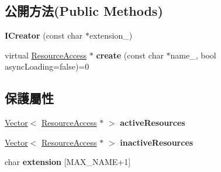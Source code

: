 \subsection*{公開方法(Public Methods)}
\begin{DoxyCompactItemize}
\item 
{\bfseries I\+Creator} (const char $\ast$extension\+\_\+)\hypertarget{class_magnum_1_1_resource_access_1_1_i_creator_a86b8e0149a78a786a3d72f5f0ebf4f81}{}\label{class_magnum_1_1_resource_access_1_1_i_creator_a86b8e0149a78a786a3d72f5f0ebf4f81}

\item 
virtual \hyperlink{class_magnum_1_1_resource_access}{Resource\+Access} $\ast$ {\bfseries create} (const char $\ast$name\+\_\+, bool async\+Loading=false)=0\hypertarget{class_magnum_1_1_resource_access_1_1_i_creator_aa8d4710c6f1c322f9a6bc58c34b0496f}{}\label{class_magnum_1_1_resource_access_1_1_i_creator_aa8d4710c6f1c322f9a6bc58c34b0496f}

\end{DoxyCompactItemize}
\subsection*{保護屬性}
\begin{DoxyCompactItemize}
\item 
\hyperlink{class_magnum_1_1_vector}{Vector}$<$ \hyperlink{class_magnum_1_1_resource_access}{Resource\+Access} $\ast$ $>$ {\bfseries active\+Resources}\hypertarget{class_magnum_1_1_resource_access_1_1_i_creator_a64cf122fb2f630a4e4e6f172a5d204c7}{}\label{class_magnum_1_1_resource_access_1_1_i_creator_a64cf122fb2f630a4e4e6f172a5d204c7}

\item 
\hyperlink{class_magnum_1_1_vector}{Vector}$<$ \hyperlink{class_magnum_1_1_resource_access}{Resource\+Access} $\ast$ $>$ {\bfseries inactive\+Resources}\hypertarget{class_magnum_1_1_resource_access_1_1_i_creator_aece272dd176887d96d1269a0789611d8}{}\label{class_magnum_1_1_resource_access_1_1_i_creator_aece272dd176887d96d1269a0789611d8}

\item 
char {\bfseries extension} \mbox{[}M\+A\+X\+\_\+\+N\+A\+ME+1\mbox{]}\hypertarget{class_magnum_1_1_resource_access_1_1_i_creator_a51dcb2cc0d79dc6bf311b4348207d934}{}\label{class_magnum_1_1_resource_access_1_1_i_creator_a51dcb2cc0d79dc6bf311b4348207d934}

\end{DoxyCompactItemize}
